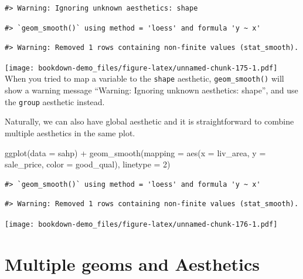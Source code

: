 \documentclass[
]{book}
\newenvironment{Shaded}{\begin{snugshade}}{\end{snugshade}}
\newcommand{\AttributeTok}[1]{\textcolor[rgb]{0.77,0.63,0.00}{#1}}
\newcommand{\DecValTok}[1]{\textcolor[rgb]{0.00,0.00,0.81}{#1}}
\newcommand{\FunctionTok}[1]{\textcolor[rgb]{0.00,0.00,0.00}{#1}}
\newcommand{\NormalTok}[1]{#1}
\newcommand{\SpecialCharTok}[1]{\textcolor[rgb]{0.00,0.00,0.00}{#1}}
\begin{document}
\begin{verbatim}
#> Warning: Ignoring unknown aesthetics: shape
\end{verbatim}

\begin{verbatim}
#> `geom_smooth()` using method = 'loess' and formula 'y ~ x'
\end{verbatim}

\begin{verbatim}
#> Warning: Removed 1 rows containing non-finite values (stat_smooth).
\end{verbatim}

\texttt{[image: bookdown-demo\_files/figure-latex/unnamed-chunk-175-1.pdf]}
When you tried to map a variable to the \texttt{shape} aesthetic, \texttt{geom\_smooth()} will show a warning message ``Warning: Ignoring unknown aesthetics: shape'', and use the \texttt{group} aesthetic instead.

Naturally, we can also have global aesthetic and it is straightforward to combine multiple aesthetics in the same plot.

\begin{Shaded}
\begin{Highlighting}[]
\FunctionTok{ggplot}\NormalTok{(}\AttributeTok{data =}\NormalTok{ sahp) }\SpecialCharTok{+} \FunctionTok{geom\_smooth}\NormalTok{(}\AttributeTok{mapping =} \FunctionTok{aes}\NormalTok{(}\AttributeTok{x =}\NormalTok{ liv\_area, }\AttributeTok{y =}\NormalTok{ sale\_price, }\AttributeTok{color =}\NormalTok{ good\_qual), }\AttributeTok{linetype =} \DecValTok{2}\NormalTok{)}
\end{Highlighting}
\end{Shaded}

\begin{verbatim}
#> `geom_smooth()` using method = 'loess' and formula 'y ~ x'
\end{verbatim}

\begin{verbatim}
#> Warning: Removed 1 rows containing non-finite values (stat_smooth).
\end{verbatim}

\texttt{[image: bookdown-demo\_files/figure-latex/unnamed-chunk-176-1.pdf]}

\hypertarget{multi-geom}{%
\section{Multiple geoms and Aesthetics}\label{multi-geom}}
\end{document}
